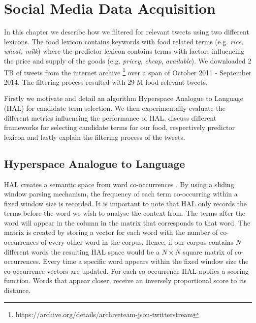 

\let\cleardoublepage\clearpage

\chapter{Social Media Data Acquisition}

In this chapter we describe how we filtered for relevant tweets using two different lexicons. The food lexicon contains keywords with food related terms  (e.g. \emph {rice, wheat, milk}) where the predictor lexicon contains terms with factors influencing the price and supply of the goods (e.g. \emph{pricey}, \emph {cheap}, \emph{available}). We downloaded 2 TB of tweets from the internet archive \footnote{https://archive.org/details/archiveteam-json-twitterstream}  over a span of October 2011 - September 2014.  The filtering process resulted with 29 M food relevant tweets.

Firstly we motivate and detail an algorithm Hyperspace Analogue to Language (HAL)  \cite{lund96} for candidate term selection. We then  experimentally evaluate the  different metrics influencing the performance of HAL, discuss different frameworks for selecting candidate terms for our food, respectively predictor lexicon and lastly explain the filtering process of the tweets. 



\section{Hyperspace Analogue to Language}

HAL creates a semantic space from word co-occurrences \cite{lund96}. By using a sliding window parsing mechanism, the frequency of each term co-occurring within a fixed window size is recorded.  It is important to note that HAL only records the terms before the word we wish to analyse the context from. The terms after the word will appear in the column in the matrix that corresponds to that word.  The matrix is created by storing a vector for each word with the number of co-occurrences of every other word in the corpus. Hence, if our corpus contains $N$ different words the resulting HAL space would be a $N \times N$ square matrix of co-occurrences. Every time a specific word appears within the fixed window size the co-occurrence vectors are updated. For each co-occurrence HAL applies a scoring function. Words that appear closer, receive an inversely proportional score to its distance.

